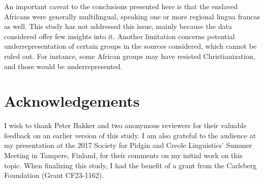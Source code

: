 \documentclass[output=paper,colorlinks,citecolor=brown]{langscibook}
\begin{document}
An important caveat to the conclusions presented here is that the enslaved Africans were generally multilingual, speaking one or more regional lingua francas as well. This study has not addressed this issue, mainly because the data considered offer few insights into it. Another limitation concerns potential underrepresentation of certain groups in the sources considered, which cannot be ruled out. For instance, some African groups may have resisted Christianization, and those would be underrepresented.


\section*{Acknowledgements}
  I wish to thank Peter Bakker and two anonymous reviewers for their valuable feedback on an earlier version of this study. I am also grateful to the audience at my presentation at the 2017 Society for Pidgin and Creole Linguistics’ Summer Meeting in Tampere, Finland, for their comments on my initial work on this topic. When finalizing this study, I had the benefit of a grant from the Carlsberg Foundation (Grant CF23-1162).


{\sloppy\printbibliography[heading=subbibliography,notkeyword=this]}
\end{document}
